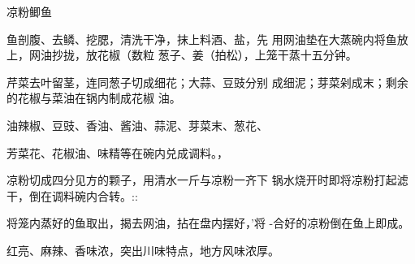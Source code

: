 \begin{recipe}{凉粉鲫鱼}

\ingredients


\cooking

\step 鱼剖腹、去鳞、挖腮，清洗干净，抹上料酒、盐，先 用网油垫在大蒸碗内将鱼放上，网油抄拢，放花椒（数粒 葱子、姜（拍松），上笼干蒸十五分钟。

\step 芹菜去叶留茎，连同葱子切成细花；大蒜、豆豉分别 成细泥；芽菜剁成末；剩余的花椒与菜油在锅内制成花椒
油。

\step 油辣椒、豆豉、香油、酱油、蒜泥、芽菜末、葱花、

芳菜花、花椒油、味精等在碗内兑成调料。，

\step 凉粉切成四分见方的颗子，用清水一斤与凉粉一齐下 锅水烧开时即将凉粉打起滤干，倒在调料碗内合转。::

\step 将笼内蒸好的鱼取出，揭去网油，拈在盘内摆好，’将 -合好的凉粉倒在鱼上即成。

\notes

红亮、麻辣、香味浓，突出川味特点，地方风味浓厚。

\end{recipe}

